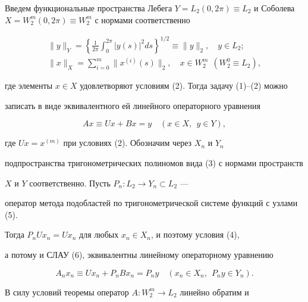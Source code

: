 \begin{pf}


Введем функциональные пространства Лебега $Y=L_2(0,2 \pi)\equiv


L_2$ и Соболева $X=W_2^m(0,2 \pi)\equiv W_2^m$ с нормами соответственно


\begin{gather*}


\| y \|_Y=\left\{\frac{1}{2 \pi} \int_0^{2 \pi} |y(s)|


^2 ds\right\}^{1/2} \equiv \| y \|_2, \quad y \in L_2;\\


%


\| x \|_X=\sum_{i=0}^m \| x^{(i)}(s) \|_2,


\quad x \in W_2^m \ \ (W_2^0 \equiv L_2),


\end{gather*}


где элементы $x \in X$ удовлетворяют условиям (2). Тогда задачу (1)--(2) можно


записать в виде эквивалентного ей линейного операторного уравнения


\begin{equation}


Ax \equiv Ux + Bx=y \quad (x \in X,\ \ y \in Y),


\end{equation}


где $Ux=x^{(m)}$ при условиях (2). Обозначим через $X_n$ и $Y_n$


подпространства тригонометрических полиномов вида (3) с нормами пространств


$X$ и $Y$ соответственно. Пусть $P_n:L_2 \to Y_{n} \subset L_2$ ---


оператор метода подобластей по тригонометрической системе функций с узлами (5).


Тогда $P_n Ux_n=Ux_n$ для любых $x_n \in X_n$, и поэтому условия (4),


а потому и СЛАУ (6), эквивалентны линейному операторному уравнению


\begin{equation}


A_nx_n \equiv Ux_n + P_nBx_n=P_ny \quad (x_n \in X_n,\ \ P_ny \in Y_n).


\end{equation}





В силу условий теоремы оператор $A:W_2^m \to L_2$ линейно обратим и



\end{pf}
